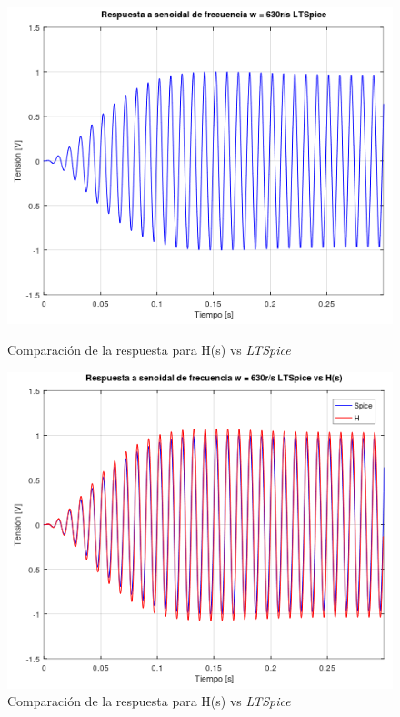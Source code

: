 \documentclass[11pt,a4paper]{report}
\begin{document}
\begin{figure}[h!]
\centering
\includegraphics[scale=1]{rtaSenoidalMedioSpice.png}
\caption{Comparación de la respuesta para H(s) vs \textit{LTSpice}}
\includegraphics[scale=0.96]{rtaSenoidalMedioSpiceComp.png}
\caption{Comparación de la respuesta para H(s) vs \textit{LTSpice}}
\end{figure}

\newpage
\end{document}
